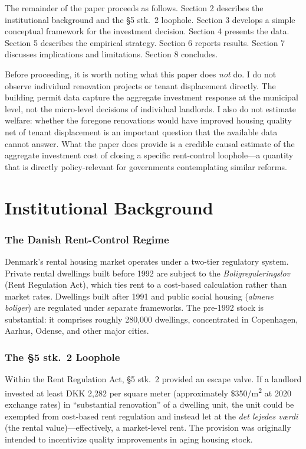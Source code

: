 \documentclass[12pt]{article}
\begin{document}
The remainder of the paper proceeds as follows. Section 2 describes the institutional background and the \S5 stk.\ 2 loophole. Section 3 develops a simple conceptual framework for the investment decision. Section 4 presents the data. Section 5 describes the empirical strategy. Section 6 reports results. Section 7 discusses implications and limitations. Section 8 concludes.

Before proceeding, it is worth noting what this paper does \emph{not} do. I do not observe individual renovation projects or tenant displacement directly. The building permit data capture the aggregate investment response at the municipal level, not the micro-level decisions of individual landlords. I also do not estimate welfare: whether the foregone renovations would have improved housing quality net of tenant displacement is an important question that the available data cannot answer. What the paper does provide is a credible causal estimate of the aggregate investment cost of closing a specific rent-control loophole---a quantity that is directly policy-relevant for governments contemplating similar reforms.

\section{Institutional Background}

\subsubsection*{The Danish Rent-Control Regime} Denmark's rental housing market operates under a two-tier regulatory system. Private rental dwellings built before 1992 are subject to the \emph{Boligreguleringslov} (Rent Regulation Act), which ties rent to a cost-based calculation rather than market rates. Dwellings built after 1991 and public social housing (\emph{almene boliger}) are regulated under separate frameworks. The pre-1992 stock is substantial: it comprises roughly 280,000 dwellings, concentrated in Copenhagen, Aarhus, Odense, and other major cities.

\subsubsection*{The \S5 stk.\ 2 Loophole} Within the Rent Regulation Act, \S5 stk.\ 2 provided an escape valve. If a landlord invested at least DKK 2,282 per square meter (approximately \$350/m\textsuperscript{2} at 2020 exchange rates) in ``substantial renovation'' of a dwelling unit, the unit could be exempted from cost-based rent regulation and instead let at the \emph{det lejedes v{\ae}rdi} (the rental value)---effectively, a market-level rent. The provision was originally intended to incentivize quality improvements in aging housing stock.
\end{document}

